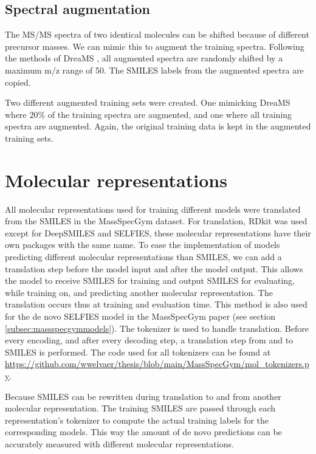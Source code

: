 \subsection{Spectral augmentation}

The \ac{MS/MS} spectra of two identical molecules can be shifted because of different precursor masses.
We can mimic this to augment the training spectra.
Following the methods of DreaMS \cite{bushuiev2024emergence}, all augmented spectra are randomly shifted by a maximum m/z range of 50.
The SMILES labels from the augmented spectra are copied.

Two different augmented training sets were created. One mimicking DreaMS where $20\%$ of the training spectra are augmented, and one where all training spectra are augmented.
Again, the original training data is kept in the augmented training sets.

\section{Molecular representations}
\label{sec:representations}

All molecular representations used for training different models were translated from the SMILES in the MassSpecGym dataset.
For translation, RDkit was used except for DeepSMILES and SELFIES, these molecular representations have their own packages with the same name.
To ease the implementation of models predicting different molecular representations than SMILES,
we can add a translation step before the model input and after the model output.
This allows the model to receive SMILES for training and output SMILES for evaluating,
while training on, and predicting another molecular representation.
The translation occurs thus at training and evaluation time.
This method is also used for the de novo SELFIES model in the MassSpecGym paper (see section \ref{subsec:massspecgymmodels}).
The tokenizer is used to handle translation. Before every encoding, and after every decoding step, a translation step from and to SMILES is performed.
The code used for all tokenizers can be found at \url{https://github.com/wwelvaer/thesis/blob/main/MassSpecGym/mol_tokenizers.py}.

Because SMILES can be rewritten during translation to and from another molecular representation.
The training SMILES are passed through each representation's tokenizer to compute the actual training labels for the corresponding models.
This way the amount of de novo predictions can be accurately measured with different molecular representations.

